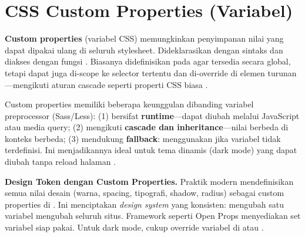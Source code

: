 \section{CSS Custom Properties (Variabel)}

\textbf{Custom properties} (variabel CSS) memungkinkan penyimpanan nilai yang dapat dipakai ulang di seluruh stylesheet. Dideklarasikan dengan sintaks  dan diakses dengan fungsi . Biasanya didefinisikan pada  agar tersedia secara global, tetapi dapat juga di-scope ke selector tertentu dan di-override di elemen turunan---mengikuti aturan cascade seperti properti CSS biasa \cite{mdnCss}.


Custom properties memiliki beberapa keunggulan dibanding variabel preprocessor (Sass/Less): (1) bersifat \textbf{runtime}---dapat diubah melalui JavaScript atau media query; (2) mengikuti \textbf{cascade dan inheritance}---nilai berbeda di konteks berbeda; (3) mendukung \textbf{fallback}:  menggunakan  jika variabel tidak terdefinisi. Ini menjadikannya ideal untuk tema dinamis (dark mode) yang dapat diubah tanpa reload halaman \cite{webdevCss}.

\begin{konsep}
\textbf{Design Token dengan Custom Properties.} Praktik modern mendefinisikan semua nilai desain (warna, spacing, tipografi, shadow, radius) sebagai custom properties di . Ini menciptakan \textit{design system} yang konsisten: mengubah satu variabel mengubah seluruh situs. Framework seperti Open Props menyediakan set variabel siap pakai. Untuk dark mode, cukup override variabel di \code{[data-theme="dark"]} atau  \cite{cssTricks}.
\end{konsep}

